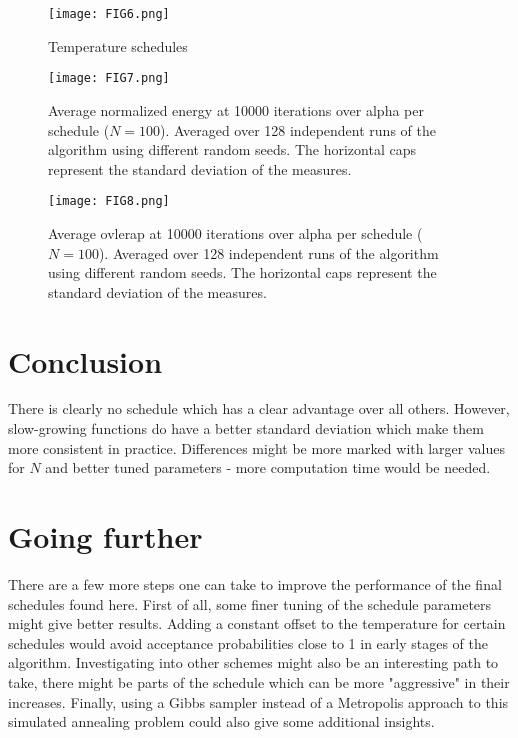 \documentclass[a4paper]{article}
\begin{document}
\begin{figure}
\centering
\texttt{[image: FIG6.png]}
\caption{\label{fig:FIG6}Temperature schedules}
\end{figure}

\begin{figure}
\centering
\texttt{[image: FIG7.png]}
\caption{\label{fig:FIG7}Average normalized energy at 10000 iterations over alpha per schedule ($N = 100$). Averaged over 128 independent runs of the algorithm using different random seeds. The horizontal caps represent the standard deviation of the measures.}
\end{figure}
\begin{figure}
\centering
\texttt{[image: FIG8.png]}
\caption{\label{fig:FIG8}Average ovlerap at 10000 iterations over alpha per schedule ($N = 100$). Averaged over 128 independent runs of the algorithm using different random seeds. The horizontal caps represent the standard deviation of the measures.}
\end{figure}

\section{Conclusion}
There is clearly no schedule which has a clear advantage over all others. However, slow-growing functions do have a better standard deviation which make them more consistent in practice. Differences might be more marked with larger values for $N$ and better tuned parameters - more computation time would be needed.

\section{Going further}
There are a few more steps one can take to improve the performance of the final schedules found here. First of all, some finer tuning of the schedule parameters might give better results. Adding a constant offset to the temperature for certain schedules would avoid acceptance probabilities close to 1 in early stages of the algorithm. Investigating into other schemes might also be an interesting path to take, there might be parts of the schedule which can be more "aggressive" in their increases. Finally, using a Gibbs sampler instead of a Metropolis approach to this simulated annealing problem could also give some additional insights.
\end{document}
